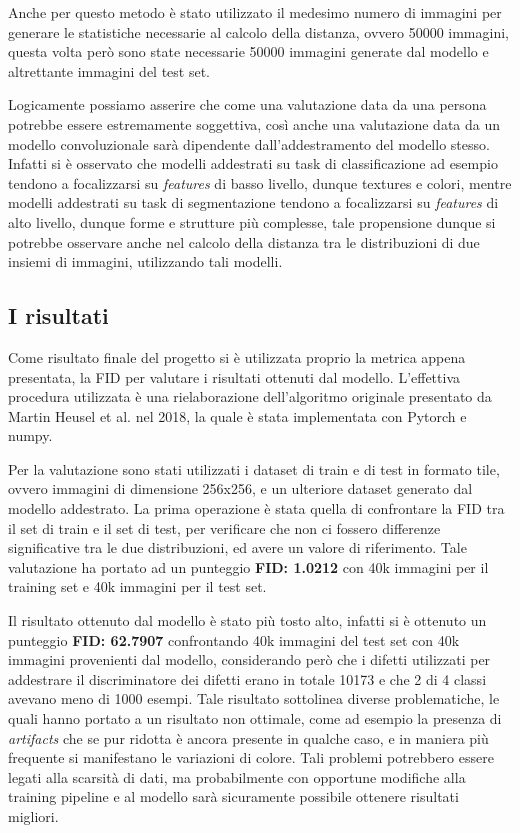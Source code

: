 Anche per questo metodo è stato utilizzato il medesimo numero di immagini per generare le statistiche necessarie al calcolo della distanza, 
ovvero 50000 immagini, questa volta però sono state necessarie 50000 immagini generate dal modello e altrettante immagini del test set.

Logicamente possiamo asserire che come una valutazione data da una persona potrebbe essere estremamente soggettiva, così anche una valutazione
data da un modello convoluzionale sarà dipendente dall'addestramento del modello stesso.
Infatti si è osservato che modelli addestrati su task di classificazione ad esempio tendono a focalizzarsi su \textit{features} di basso livello, dunque textures
e colori, mentre modelli addestrati su task di segmentazione tendono a focalizzarsi su \textit{features} di alto livello, dunque forme e strutture più complesse,
tale propensione dunque si potrebbe osservare anche nel calcolo della distanza tra le distribuzioni di due insiemi di immagini, utilizzando tali
modelli.

\subsection{I risultati}
Come risultato finale del progetto si è utilizzata proprio la metrica appena presentata, la FID per valutare i risultati ottenuti dal modello.
L'effettiva procedura utilizzata è una rielaborazione dell'algoritmo originale presentato da Martin Heusel et al. \cite{heusel2018gans} nel 2018,
la quale è stata implementata con Pytorch e numpy.

Per la valutazione sono stati utilizzati i dataset di train e di test in formato tile, ovvero immagini di dimensione 256x256, e un ulteriore dataset generato
dal modello addestrato. La prima operazione è stata quella di confrontare la FID tra il set di train e il set di test, per verificare che non ci fossero
differenze significative tra le due distribuzioni, ed avere un valore di riferimento.
Tale valutazione ha portato ad un punteggio \textbf{FID: 1.0212} con 40k immagini per il training set e 40k immagini per il test set.

Il risultato ottenuto dal modello è stato più tosto alto, infatti si è ottenuto un punteggio \textbf{FID: 62.7907} confrontando 40k immagini del test set con 
40k immagini provenienti dal modello, considerando però che i difetti utilizzati per addestrare il discriminatore dei difetti erano in totale 10173
e che 2 di 4 classi avevano meno di 1000 esempi.
Tale risultato sottolinea diverse problematiche, le quali hanno portato a un risultato non ottimale, come ad esempio la presenza di \textit{artifacts} 
che se pur ridotta è ancora presente in qualche caso, e in maniera più frequente si manifestano le variazioni di colore.
Tali problemi potrebbero essere legati alla scarsità di dati, ma probabilmente con opportune modifiche alla training pipeline e al modello sarà sicuramente possibile
ottenere risultati migliori.

